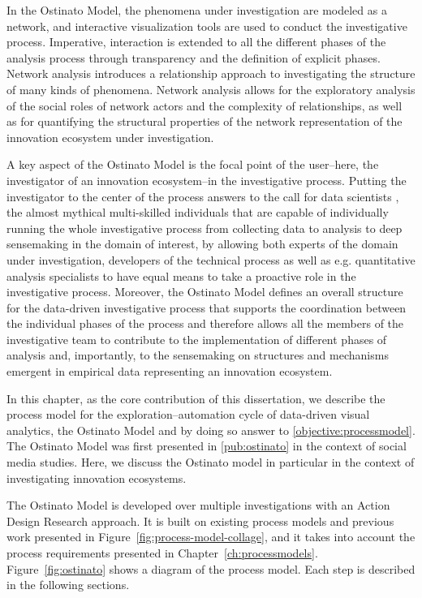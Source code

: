 In the Ostinato Model, the phenomena under investigation are modeled as a network, and interactive visualization tools are used to conduct the investigative process. Imperative, interaction is extended to all the different phases of the analysis process through transparency and the definition of explicit phases. Network analysis introduces a relationship approach to investigating the structure of many kinds of phenomena. Network analysis allows for the exploratory analysis of the social roles of network actors and the complexity of relationships, as well as for quantifying the structural properties of the network representation of the innovation ecosystem under investigation.

A key aspect of the Ostinato Model is the focal point of the user--here, the investigator of an innovation ecosystem--in the investigative process. Putting the investigator to the center of the process answers to the call for data scientists \citep{Davenport2014BigOpportunities}, the almost mythical multi-skilled individuals that are capable of individually running the whole investigative process from collecting data to analysis to deep sensemaking in the domain of interest, by allowing both experts of the domain under investigation, developers of the technical process as well as e.g. quantitative analysis specialists to have equal means to take a proactive role in the investigative process. Moreover, the Ostinato Model defines an overall structure for the data-driven investigative process that supports the coordination between the individual phases of the process and therefore allows all the members of the investigative team to contribute to the implementation of different phases of analysis and, importantly, to the sensemaking on structures and mechanisms emergent in empirical data representing an innovation ecosystem.

In this chapter, as the core contribution of this dissertation, we describe the process model for the exploration–automation cycle of data-driven visual analytics, the Ostinato Model and by doing so answer to \ref{objective:processmodel}. The Ostinato Model was first presented in \ref{pub:ostinato} in the context of social media studies. Here, we discuss the Ostinato model in particular in the context of investigating innovation ecosystems.

The Ostinato Model is developed over multiple investigations with an Action Design Research approach. It is built on existing process models and previous work presented in Figure~\ref{fig:process-model-collage}, and it takes into account the process requirements presented in Chapter~\ref{ch:processmodels}. Figure~\ref{fig:ostinato} shows a diagram of the process model. Each step is described in the following sections.

